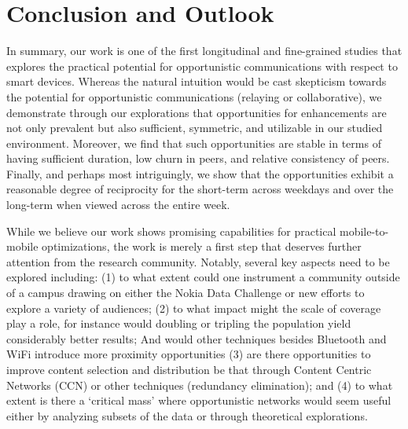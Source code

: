 \chapter{Conclusion and Outlook}
\label{chap:conclusion}

In summary, our work is one of the first longitudinal and fine-grained studies that explores the practical potential for opportunistic communications with respect to smart devices.  Whereas the natural intuition would be cast skepticism towards the potential for opportunistic communications (relaying or collaborative), we demonstrate through our explorations that opportunities for enhancements are not only prevalent but also sufficient, symmetric, and utilizable in our studied environment. Moreover, we find that such opportunities are stable in terms of having sufficient duration, low churn in peers, and relative consistency of peers. Finally, and perhaps most intriguingly, we show that the opportunities exhibit a reasonable degree of reciprocity for the short-term across weekdays and over the long-term when viewed across the entire week.

While we believe our work shows promising capabilities for practical mobile-to-mobile optimizations, the work is merely a first step that deserves further attention from the research community.  Notably, several key aspects need to be explored including: (1) to what extent could one instrument a community outside of a campus drawing on either the Nokia Data Challenge or new efforts to explore a variety of audiences; (2) to what impact might the scale of coverage play a role, for instance would doubling or tripling the population yield considerably better results; And would other techniques besides Bluetooth and WiFi introduce more proximity opportunities (3) are there opportunities to improve content selection and distribution be that through Content Centric Networks (CCN) or other techniques (redundancy elimination); and (4) to what extent is there a `critical mass' where opportunistic networks would seem useful either by analyzing subsets of the data or through theoretical explorations.   
